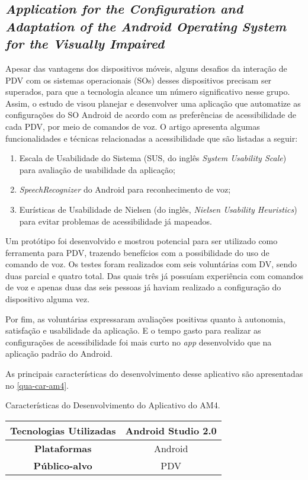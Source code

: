 \subsection{\emph{Application for the Configuration and Adaptation of the Android Operating System for the Visually Impaired}}

Apesar das vantagens dos dispositivos móveis, alguns desafios da interação de PDV com os sistemas operacionais (SOs) desses dispositivos precisam ser superados, para que a tecnologia alcance
um número significativo nesse grupo. Assim, o estudo de  visou planejar e desenvolver uma aplicação que automatize as configurações do SO Android de acordo com
as preferências de acessibilidade de cada PDV, por meio de comandos de voz. O artigo apresenta algumas funcionalidades e técnicas relacionadas a acessibilidade que são listadas a seguir:

\begin{enumerate}
  \item Escala de Usabilidade do Sistema (SUS, do inglês \emph{System Usability Scale}) para avaliação de usabilidade da aplicação;
  \item \emph{SpeechRecognizer} do Android para reconhecimento de voz;
  \item Eurísticas de Usabilidade de Nielsen (do inglês, \emph{Nielsen Usability Heuristics}) para evitar problemas de acessibilidade já mapeados.
\end{enumerate}

Um protótipo foi desenvolvido e mostrou potencial para ser utilizado como ferramenta para PDV, trazendo benefícios com a possibilidade do uso de comando de voz.
Os testes foram realizados com seis voluntárias com DV, sendo duas parcial e quatro total.
Das quais três já possuíam experiência com comandos de voz e apenas duas das seis pessoas já haviam realizado a configuração do dispositivo alguma vez.

Por fim, as voluntárias expressaram avaliações positivas quanto à autonomia, satisfação e usabilidade da aplicação.
E o tempo gasto para realizar as configurações de acessibilidade foi mais curto no \emph{app} desenvolvido que na aplicação padrão do Android.

As principais características do desenvolvimento desse aplicativo são apresentadas no \autoref{qua-car-am4}.

\begin{quadro}[htb!]
  \caption{\label{qua-car-am4}Características do Desenvolvimento do Aplicativo do AM4.}
  \begin{tabular}{|c|c|}
    \hline
    \textbf{Tecnologias Utilizadas} & Android Studio 2.0 \\ \hline
    \textbf{Plataformas}            & Android            \\ \hline
    \textbf{Público-alvo}           & PDV                \\
    \hline
  \end{tabular}
\end{quadro}

